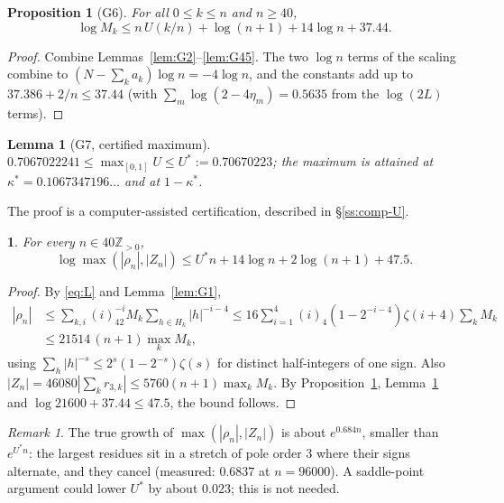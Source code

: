 \documentclass{amsart}
\newtheorem{lemma}[theorem]{Lemma}
\newtheorem{proposition}[theorem]{Proposition}
\newcommand{\thisthmname}{}
\newtheorem*{genericthm}{\thisthmname}
\newenvironment{namedthm}[1]{\renewcommand{\thisthmname}{#1}\begin{genericthm}}{\end{genericthm}}
\theoremstyle{definition}
\theoremstyle{remark}
\newtheorem{remark}[theorem]{Remark}
\numberwithin{equation}{section}
\newcommand{\Z}{\mathbb{Z}}
\begin{document}
\begin{proposition}[G6]\label{prop:G6}
For all $0\le k\le n$ and $n\ge40$,
\[
  \log M_k\le n\,U(k/n)+\log(n+1)+14\log n+37.44 .
\]
\end{proposition}

\begin{proof}
Combine Lemmas~\ref{lem:G2}--\ref{lem:G45}. The two $\log n$ terms of the
scaling combine to $(N-\sum_ka_k)\log n=-4\log n$, and the constants add up
to $37.386+2/n\le37.44$ (with $\sum_m\log(2-4\eta_m)=0.5635$ from the
$\log(2L)$ terms).
\end{proof}

\begin{lemma}[G7, certified maximum]\label{lem:G7}
$0.7067022241\le\max_{[0,1]}U\le U^*:=0.70670223$; the maximum is attained at
$\kappa^*=0.1067347196\ldots$ and at $1-\kappa^*$.
\end{lemma}

The proof is a computer-assisted certification, described in
\S\ref{ss:comp-U}.

\begin{namedthm}{Theorem G}
For every $n\in40\Z_{>0}$,
\[
  \log\max(|\rho_n|,|Z_n|)\le U^*n+14\log n+2\log(n+1)+47.5 .
\]
\end{namedthm}

\begin{proof}
By \eqref{eq:L} and Lemma~\ref{lem:G1},
\begin{align*}
  |\rho_n|&\le\sum_{k,i}(i)_42^{-i}M_k\sum_{h\in H_k}|h|^{-i-4}
  \le16\sum_{i=1}^{4}(i)_4(1-2^{-i-4})\zeta(i+4)\sum_kM_k\\
  &\le21514\,(n+1)\max_kM_k,
\end{align*}
using $\sum_h|h|^{-s}\le2^s(1-2^{-s})\zeta(s)$ for distinct half-integers of
one sign. Also $|Z_n|=46080|\sum_kr_{3,k}|\le5760(n+1)\max_kM_k$. By
Proposition~\ref{prop:G6}, Lemma~\ref{lem:G7} and $\log21600+37.44\le47.5$,
the bound follows.
\end{proof}

\begin{remark}\label{rem:G-true}
The true growth of $\max(|\rho_n|,|Z_n|)$ is about $e^{0.684n}$, smaller than
$e^{U^*n}$: the largest residues sit in a stretch of pole order $3$ where
their signs alternate, and they cancel (measured: $0.6837$ at $n=96000$). A
saddle-point argument could lower $U^*$ by about $0.023$; this is not needed.
\end{remark}

\end{document}
